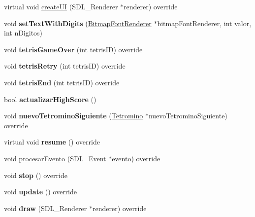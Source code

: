 \begin{DoxyCompactItemize}
\item 
virtual void \hyperlink{class_tetris_interfaz_a31071ba2d473bfc4cd600f9d4cac2e11}{create\+UI} (S\+D\+L\+\_\+\+Renderer $\ast$renderer) override
\item 
void {\bfseries set\+Text\+With\+Digits} (\hyperlink{class_bitmap_font_renderer}{Bitmap\+Font\+Renderer} $\ast$bitmap\+Font\+Renderer, int valor, int n\+Digitos)\hypertarget{class_tetris_interfaz_acbb5c6288f626b173c44965afc3fff44}{}\label{class_tetris_interfaz_acbb5c6288f626b173c44965afc3fff44}

\item 
void {\bfseries tetris\+Game\+Over} (int tetris\+ID) override\hypertarget{class_tetris_interfaz_a8296ebf35154372e84646e1a9effd042}{}\label{class_tetris_interfaz_a8296ebf35154372e84646e1a9effd042}

\item 
void {\bfseries tetris\+Retry} (int tetris\+ID) override\hypertarget{class_tetris_interfaz_ad6b0a3ef219d1d66b0faeac6f26217ac}{}\label{class_tetris_interfaz_ad6b0a3ef219d1d66b0faeac6f26217ac}

\item 
void {\bfseries tetris\+End} (int tetris\+ID) override\hypertarget{class_tetris_interfaz_ad87cd7fa3331f7d9e68387e170bd37d5}{}\label{class_tetris_interfaz_ad87cd7fa3331f7d9e68387e170bd37d5}

\item 
bool {\bfseries actualizar\+High\+Score} ()\hypertarget{class_tetris_interfaz_a41882ffb133a54b4ec1fd091459e8173}{}\label{class_tetris_interfaz_a41882ffb133a54b4ec1fd091459e8173}

\item 
void {\bfseries nuevo\+Tetromino\+Siguiente} (\hyperlink{class_tetromino}{Tetromino} $\ast$nuevo\+Tetromino\+Siguiente) override\hypertarget{class_tetris_interfaz_a06809cbd340eaa86addde7807fb4e886}{}\label{class_tetris_interfaz_a06809cbd340eaa86addde7807fb4e886}

\item 
virtual void {\bfseries resume} () override\hypertarget{class_tetris_interfaz_ae74b382fc78f2bb7518014516c7840bb}{}\label{class_tetris_interfaz_ae74b382fc78f2bb7518014516c7840bb}

\item 
void \hyperlink{class_tetris_interfaz_af6474da93bfff9fafd0fce42b371b7a9}{procesar\+Evento} (S\+D\+L\+\_\+\+Event $\ast$evento) override
\item 
void {\bfseries stop} () override\hypertarget{class_tetris_interfaz_adba131873231679f87b2b515aa86556e}{}\label{class_tetris_interfaz_adba131873231679f87b2b515aa86556e}

\item 
void {\bfseries update} () override\hypertarget{class_tetris_interfaz_af2a0686256064565793a7be01be5b840}{}\label{class_tetris_interfaz_af2a0686256064565793a7be01be5b840}

\item 
void {\bfseries draw} (S\+D\+L\+\_\+\+Renderer $\ast$renderer) override\hypertarget{class_tetris_interfaz_a917a0a3c9e5451795d54cc8968771196}{}\label{class_tetris_interfaz_a917a0a3c9e5451795d54cc8968771196}

\end{DoxyCompactItemize}
